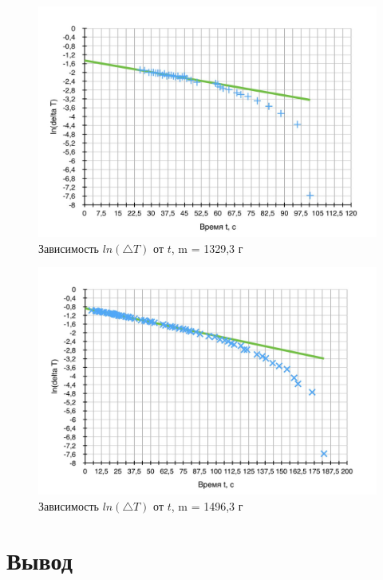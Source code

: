 \documentclass[a4paper]{article}
\begin{document}
\begin{figure}[t]
    \centering
    \includegraphics[width=16cm]{1329.jpg}
    \caption{Зависимость $ln(\triangle T)$ от $t$, m = 1329,3 г}
    \label{fig:vac}
\end{figure}

\newpage

\begin{figure}[b]
    \centering
    \includegraphics[width=16cm]{1493.jpg}
    \caption{Зависимость $ln(\triangle T)$ от $t$, m = 1496,3 г}
    \label{fig:vac}
\end{figure}

\clearpage

\section{Вывод}
\end{document}
